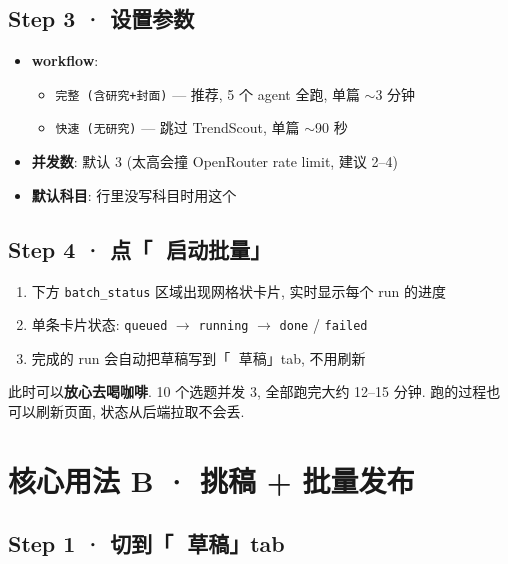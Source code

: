 \documentclass[11pt,a4paper]{article}
\begin{document}
\subsection{Step 3 · 设置参数}

\begin{itemize}[leftmargin=*]
  \item \textbf{workflow}:
  \begin{itemize}
    \item \texttt{完整 (含研究+封面)} — 推荐, 5 个 agent 全跑, 单篇 \(\sim\)3 分钟
    \item \texttt{快速 (无研究)} — 跳过 TrendScout, 单篇 \(\sim\)90 秒
  \end{itemize}
  \item \textbf{并发数}: 默认 3 (太高会撞 OpenRouter rate limit, 建议 2–4)
  \item \textbf{默认科目}: 行里没写科目时用这个
\end{itemize}

\subsection{Step 4 · 点「🚀 启动批量」}

\begin{enumerate}[leftmargin=*]
  \item 下方 \texttt{batch\_status} 区域出现网格状卡片, 实时显示每个 run 的进度
  \item 单条卡片状态: \texttt{queued} \(\to\) \texttt{running} \(\to\) \texttt{done} / \texttt{failed}
  \item 完成的 run 会自动把草稿写到「📝 草稿」tab, 不用刷新
\end{enumerate}

\begin{tipbox}
\small
此时可以\textbf{放心去喝咖啡}. 10 个选题并发 3, 全部跑完大约 12–15 分钟. 跑的过程也可以刷新页面, 状态从后端拉取不会丢.
\end{tipbox}

\section{核心用法 B · 挑稿 + 批量发布}

\subsection{Step 1 · 切到「📝 草稿」tab}
\end{document}
